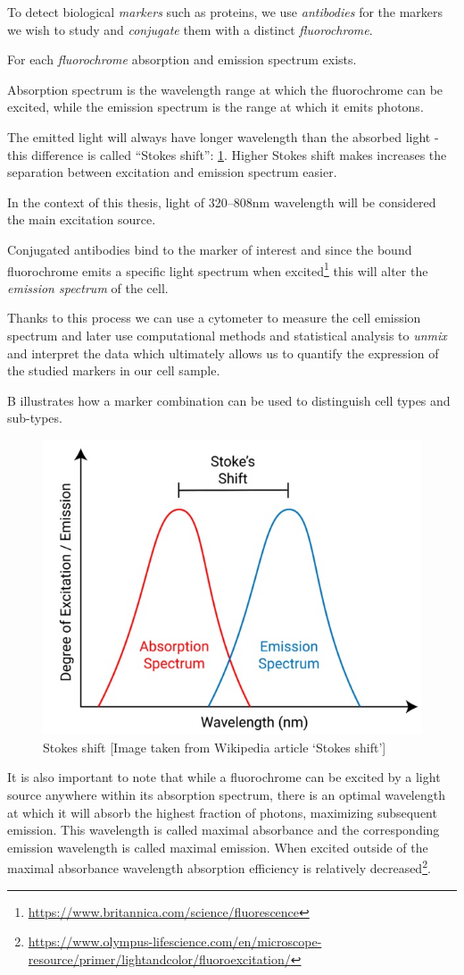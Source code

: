 To detect biological \emph{markers} such as proteins, we use \emph{antibodies} for the markers we wish to study and \emph{conjugate} them with a distinct \emph{fluorochrome}. 

For each \emph{fluorochrome} absorption and emission spectrum exists. 

Absorption spectrum is the wavelength range at which the fluorochrome can be excited, while the emission spectrum is the range at which it emits photons. 

The emitted light will always have longer wavelength than the absorbed light - this difference is called “Stokes shift”: \cref{fig:stokes}. Higher Stokes shift makes increases  the separation between excitation and emission spectrum easier.

In the context of this thesis, light of 320--808nm wavelength will be considered the main excitation source.

Conjugated antibodies bind to the marker of interest and since the bound fluorochrome emits a specific light spectrum when excited\footnote{\url{https://www.britannica.com/science/fluorescence}} this will alter the \emph{emission spectrum} of the cell.

Thanks to this process we can use a cytometer to measure the cell emission spectrum and later use computational methods and statistical analysis to \emph{unmix} and interpret the data which ultimately allows us to quantify the expression of the studied markers in our cell sample.

 B illustrates how a marker combination can be used to distinguish cell types and sub-types.

\begin{figure}
  \includegraphics[width=0.5\linewidth]{img/stokes.jpg}
  \caption{Stokes shift [Image taken from Wikipedia article `Stokes shift']}
  \label{fig:stokes}
\end{figure}

It is also important to note that while a fluorochrome can be excited by a light source anywhere within its absorption spectrum, there is an optimal wavelength at which it will absorb the highest fraction of photons, maximizing subsequent emission. This wavelength is called maximal absorbance and the corresponding emission wavelength is called maximal emission. When excited outside of the maximal absorbance wavelength absorption efficiency is relatively decreased\footnote{\url{https://www.olympus-lifescience.com/en/microscope-resource/primer/lightandcolor/fluoroexcitation/}}.

